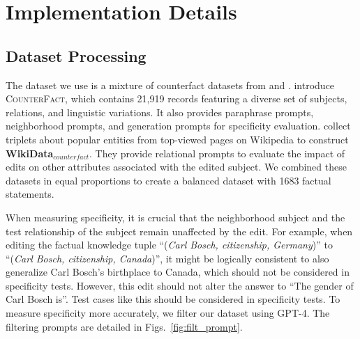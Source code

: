 \section{Implementation Details}
\label{app:implementation_details}

\subsection{Dataset Processing}
\label{app:data_details}
The dataset we use is a mixture of counterfact datasets from \citet{rome} and \citet{zhang2024comprehensive}. 
\citet{rome} introduce \textsc{CounterFact}, which contains 21,919 records featuring a diverse set of subjects, relations, and linguistic variations.
It also provides paraphrase prompts, neighborhood prompts, and generation prompts for specificity evaluation.
\citet{zhang2024comprehensive} collect triplets about popular entities from top-viewed pages on Wikipedia to construct \textbf{WikiData}$_{counterfact}$.
They provide relational prompts to evaluate the impact of edits on other attributes associated with the edited subject.
We combined these datasets in equal proportions to create a balanced dataset with 1683 factual statements.

When measuring specificity, it is crucial that the neighborhood subject and the test relationship of the subject remain unaffected by the edit.
For example, when editing the factual knowledge tuple “(\textit{Carl Bosch, citizenship, Germany})” to “(\textit{Carl Bosch, citizenship, Canada})”, it might be logically consistent to also generalize Carl Bosch's birthplace to Canada, which should not be considered in specificity tests. 
However, this edit should not alter the answer to “The gender of Carl Bosch is”. Test cases like this should be considered in specificity tests. 
To measure specificity more accurately, we filter our dataset using GPT-4. 
The filtering prompts are detailed in Figs.~\ref{fig:filt_prompt}.

